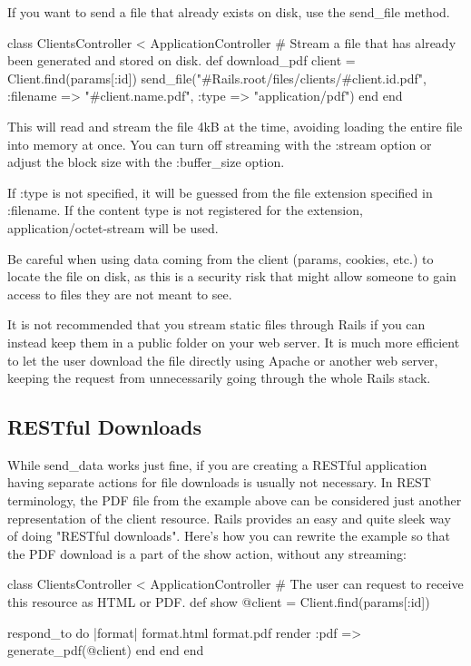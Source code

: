 \documentclass[10pt]{book}
\newenvironment{code}{%
  \scriptsize
    \verbatim
}{%
    \endverbatim
    \newline
}
\begin{document}
If you want to send a file that already exists on disk, use the send\_file method.
\begin{code}
class ClientsController < ApplicationController
  # Stream a file that has already been generated and stored on disk.
  def download_pdf
    client = Client.find(params[:id])
    send_file("#{Rails.root}/files/clients/#{client.id}.pdf",
              :filename => "#{client.name}.pdf",
              :type => "application/pdf")
  end
end
\end{code}

This will read and stream the file 4kB at the time, avoiding loading  the entire file into memory at once. You can turn off streaming with the  :stream option or adjust the block size with the :buffer\_size option.

If :type is not specified, it will be guessed from the file extension specified in :filename. If the content type is not registered for the extension, application/octet-stream will be used.

Be careful when using data coming from the  client (params, cookies, etc.) to locate the file on disk, as this is a  security risk that might allow someone to gain access to files they are  not meant to see.

It is not recommended that you stream static files  through Rails if you can instead keep them in a public folder on your  web server. It is much more efficient to let the user download the file  directly using Apache or another web server, keeping the request from  unnecessarily going through the whole Rails stack.

\subsection{ RESTful Downloads}

While send\_data works just fine, if you are creating a  RESTful application having separate actions for file downloads is  usually not necessary. In REST terminology, the PDF  file from the example above can be considered just another  representation of the client resource. Rails provides an easy and quite  sleek way of doing "RESTful downloads". Here’s how you can rewrite the  example so that the PDF download is a part of the show action, without any streaming:
\begin{code}
class ClientsController < ApplicationController
  # The user can request to receive this resource as HTML or PDF.
  def show
    @client = Client.find(params[:id])
 
    respond_to do |format|
      format.html
      format.pdf { render :pdf => generate_pdf(@client) }
    end
  end
end
\end{code}
\end{document}
